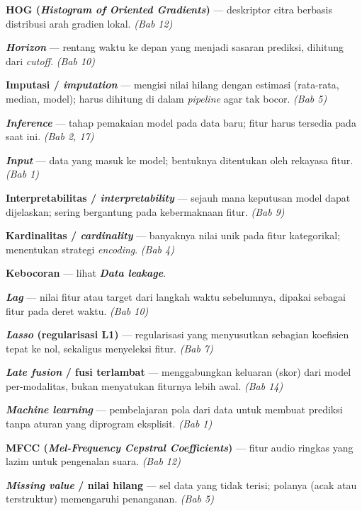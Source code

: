 \textbf{HOG (\emph{Histogram of Oriented Gradients})} --- deskriptor citra berbasis distribusi
arah gradien lokal. \emph{(Bab 12)}

\textbf{\emph{Horizon}} --- rentang waktu ke depan yang menjadi sasaran prediksi, dihitung
dari \emph{cutoff}. \emph{(Bab 10)}


\textbf{Imputasi / \emph{imputation}} --- mengisi nilai hilang dengan estimasi (rata-rata,
median, model); harus dihitung di dalam \emph{pipeline} agar tak bocor. \emph{(Bab 5)}

\textbf{\emph{Inference}} --- tahap pemakaian model pada data baru; fitur harus tersedia pada
saat ini. \emph{(Bab 2, 17)}

\textbf{\emph{Input}} --- data yang masuk ke model; bentuknya ditentukan oleh rekayasa fitur.
\emph{(Bab 1)}

\textbf{Interpretabilitas / \emph{interpretability}} --- sejauh mana keputusan model dapat
dijelaskan; sering bergantung pada kebermaknaan fitur. \emph{(Bab 9)}


\textbf{Kardinalitas / \emph{cardinality}} --- banyaknya nilai unik pada fitur kategorikal;
menentukan strategi \emph{encoding}. \emph{(Bab 4)}

\textbf{Kebocoran} --- lihat \textbf{\emph{Data leakage}}.


\textbf{\emph{Lag}} --- nilai fitur atau target dari langkah waktu sebelumnya, dipakai sebagai
fitur pada deret waktu. \emph{(Bab 10)}

\textbf{\emph{Lasso} (regularisasi L1)} --- regularisasi yang menyusutkan sebagian koefisien
tepat ke nol, sekaligus menyeleksi fitur. \emph{(Bab 7)}

\textbf{\emph{Late fusion} / fusi terlambat} --- menggabungkan keluaran (skor) dari model
per-modalitas, bukan menyatukan fiturnya lebih awal. \emph{(Bab 14)}

\textbf{\emph{Machine learning}} --- pembelajaran pola dari data untuk membuat prediksi tanpa
aturan yang diprogram eksplisit. \emph{(Bab 1)}


\textbf{MFCC (\emph{Mel-Frequency Cepstral Coefficients})} --- fitur audio ringkas yang lazim
untuk pengenalan suara. \emph{(Bab 12)}

\textbf{\emph{Missing value} / nilai hilang} --- sel data yang tidak terisi; polanya (acak
atau terstruktur) memengaruhi penanganan. \emph{(Bab 5)}

